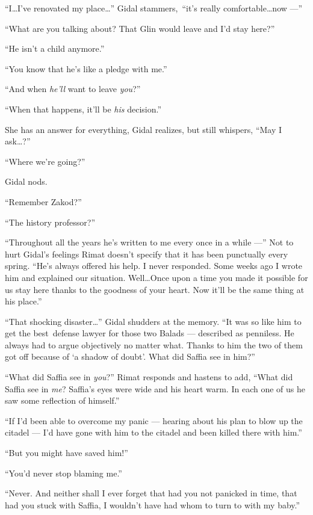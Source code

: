 \documentclass[twoside,11pt]{book}
\begin{document}
``I{\ldots}I've renovated my place{\ldots}'' Gidal stammers,~``it's really
comfortable{\ldots}now ---''

``What are you talking about?  That Glin would leave and I'd stay here?''

``He isn't a child anymore.''

``You know that he's like a pledge{ }with me.''

``And when\textit{ he'll} want to leave \textit{you}?''

``When that happens, it'll be \textit{his} decision.''

She has an answer for everything, Gidal realizes, but still whispers, ``May I ask{\ldots}?''

``Where we're going?''

Gidal nods.

``Remember Zakod?''

``The history professor?''

``Throughout all the years he's written to me every once in a while ---'' Not to hurt Gidal's
feelings Rimat doesn't specify that it has been{ }{punctually}{ }every
spring. ``He's always offered his help. I never responded. Some weeks ago I wrote him and explained our
situation. Well{\ldots}Once upon a time you made it possible for us stay here thanks to{ }the goodness
of your heart. Now it'll be the same thing at his place.''

``That shocking disaster{\ldots}'' Gidal  shudders at
the memory. ``It was so like him to get the best~defense lawyer for those two Balads ---
described as penniless. He always had to argue objectively no matter what. Thanks to him the two of them got off
because of `a shadow of doubt'. What did Saffia see in him?''

``What did Saffia see in \textit{you}?'' Rimat responds and hastens to add,
``What did Saffia see in \textit{me}? Saffia's eyes were wide and his heart warm. In each one of us he saw
some reflection of himself.''

``If I'd been able to overcome my panic --- hearing about his plan to blow up the citadel --- I'd have gone
with him to the citadel and been killed there with him.''

``But you might have saved him!''

``You'd never stop blaming me.''

``Never. And neither shall I ever forget that had you not panicked in time, that had you stuck with
Saffia, I wouldn't have had whom to turn to with my baby.''
\end{document}
